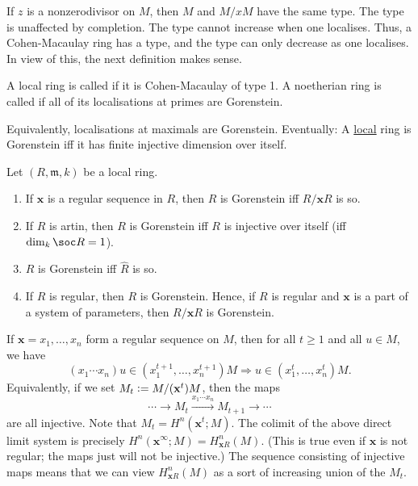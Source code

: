 \documentclass[12pt]{article}
\begin{document}
If $z$ is a nonzerodivisor on $M$, then $M$ and $M/xM$ have the same type. The type is unaffected by completion. The type cannot increase when one localises. Thus, a Cohen-Macaulay ring has a type, and the type can only decrease as one localises. In view of this, the next definition makes sense.

\begin{defn}
	A local ring is called  if it is Cohen-Macaulay of type 1. A noetherian ring is called  if all of its localisations at primes are Gorenstein.
\end{defn}
Equivalently, localisations at maximals are Gorenstein. Eventually: A \underline{local} ring is Gorenstein iff it has finite injective dimension over itself.

\begin{prop}
	Let $(R, \mathfrak{m}, k)$ be a local ring. 
	\begin{enumerate}[label=(\alph*)]
		\item If $\mathbf{x}$ is a regular sequence in $R$, then $R$ is Gorenstein iff $R/\mathbf{x} R$ is so.
		\item If $R$ is artin, then $R$ is Gorenstein iff $R$ is injective over itself (iff $\dim_{k} \soc R = 1$).
		\item $R$ is Gorenstein iff $\widehat{R}$ is so.
		\item If $R$ is regular, then $R$ is Gorenstein. Hence, if $R$ is regular and $\mathbf{x}$ is a part of a system of parameters, then $R/\mathbf{x} R$ is Gorenstein.
	\end{enumerate}
\end{prop}

\begin{obs}
	If $\mathbf{x} = x_{1}, \ldots, x_{n}$ form a regular sequence on $M$, then for all $t \ge 1$ and all $u \in M$, we have
	\begin{equation*} 
		(x_{1} \cdots x_{n}) u \in (x_{1}^{t + 1}, \ldots, x_{n}^{t + 1}) M \Rightarrow u \in (x_{1}^{t}, \ldots, x_{n}^{t}) M.
	\end{equation*}
	Equivalently, if we set $M_{t} \vcentcolon= M/(\mathbf{x}^{t})M$, then the maps
	\begin{equation*} 
		\cdots \to M_{t} \xrightarrow{x_{1} \cdots x_{n}} M_{t + 1} \to \cdots
	\end{equation*}
	are all injective. \newline
	Note that $M_{t} = H^{n}(\mathbf{x}^{t}; M)$. The colimit of the above direct limit system is precisely $H^{n}(\mathbf{x}^{\infty}; M) = H_{\mathbf{x} R}^{n}(M)$. (This is true even if $\mathbf{x}$ is not regular; the maps just will not be injective.) \newline
	The sequence consisting of injective maps means that we can view $H_{\mathbf{x} R}^{n}(M)$ as a sort of increasing union of the $M_{t}$.
\end{obs}
\end{document}
